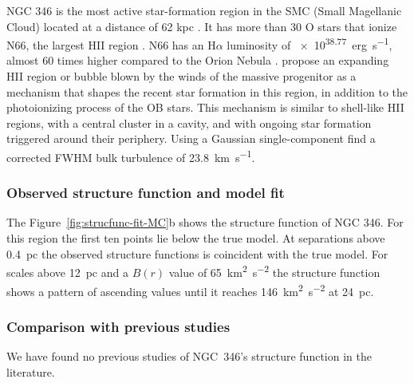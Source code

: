 \documentclass[fleqn,usenatbib, useAMS, a4paper]{mnras}
\newcommand\pos{\ensuremath{_{\mathrm{pos}}}}
\newcommand\ha{\ensuremath{\text{H}\alpha}}
\begin{document}
NGC 346 is the most active star-formation region in the SMC (Small Magellanic Cloud) located at a distance of 62 kpc \citetext{\SI{1}{\arcsecond} = \SI{0.30}{pc} ; \citealp{2001ApJ...562..303D}}. 
It has more than 30 O stars that ionize N66, the largest HII region \citep{2011ApJ...740...10D}.
N66 has an \ha{} luminosity of \SI{e38.77}{erg.s^{-1}}, almost 60 times higher compared to the Orion Nebula \citep{2010A&A...517A..39H,1984ApJ...287..116K}.
\citet{2008ApJ...688.1050G} propose an expanding HII region or bubble blown by the winds of the massive progenitor as a mechanism that shapes the recent star formation in this region, in addition to the photoionizing process of the OB stars. 
This mechanism is similar to shell-like HII regions, with a central cluster in a cavity, and with ongoing star formation triggered around their periphery.
Using a Gaussian single-component \citet{2003ApJ...586.1179D} find a corrected FWHM bulk turbulence of \SI{23.8}{km.s^{-1}}. 

\subsubsection{Observed structure function and model fit}
\label{sec:observ-struct-funct-346}

The Figure~\ref{fig:strucfunc-fit-MC}b shows the structure function of NGC 346.
For this region the first ten points lie below the true model.
At separations above \SI{0.4}{pc} the observed structure functions is coincident with the true model. 
For scales above \SI{12}{pc} and a \(B(r)\) value of \SI{65}{km^{2}.s^{-2}} the structure function shows a pattern of ascending values until it reaches \SI{146}{km^{2}.s^{-2}} at \SI{24}{pc}.

\subsubsection{Comparison with previous studies}
\label{sec:comparison-346}

We have found no previous studies of NGC~346's structure function in the literature.
\end{document}
